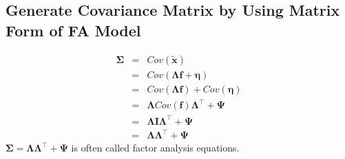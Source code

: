 \documentclass{article}
\begin{document}
\subsection{Generate Covariance Matrix by Using Matrix Form of FA Model}
\begin{eqnarray*}
\mathbf{\Sigma} &=& Cov(\mathbf{\tilde{x}})\\
                &=& Cov(\mathbf{\Lambda}\mathbf{f}+\mathbf{\eta})\\
                &=& Cov(\mathbf{\Lambda}\mathbf{f})+Cov(\mathbf{\eta})\\
                &=& \mathbf{\Lambda}Cov(\mathbf{f})\mathbf{\Lambda}^\intercal + \mathbf{\Psi}\\
                &=& \mathbf{\Lambda}\mathbf{I}\mathbf{\Lambda}^\intercal+\mathbf{\Psi}\\
                &=& \mathbf{\Lambda}\mathbf{\Lambda}^\intercal+\mathbf{\Psi}
\end{eqnarray*}
$\mathbf{\Sigma} = \mathbf{\Lambda}\mathbf{\Lambda}^\intercal+\mathbf{\Psi}$ is often called factor analysis equations.
\end{document}
